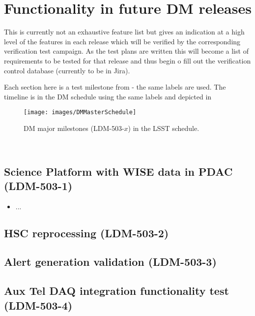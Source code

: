 \section{Functionality in future DM releases}

This is currently not an exhaustive feature list but gives an indication at a high level of the features in each release which will be verified by the corresponding verification test campaign.
As the test plans are written this will become a list of requirements to be tested for that release and thus begin o fill out the verification control database (currently to be in Jira).


Each section here is a test milestone from  - the same labels are used. The timeline is in the DM schedule using the same labels and depicted in 

\begin{figure}[htbp]
        \begin{center}
                 \texttt{[image: images/DMMasterSchedule]}
                 \caption{DM major milestones (LDM-503-$x$) in the LSST schedule. \label{fig:schedule}}
         \end{center}
 \end{figure}
~

\subsection{Science Platform with WISE data in PDAC \textbf{(LDM-503-1)}\label{LDM-503-1}}

\begin{itemize}
\item ...
\end{itemize}

\subsection{HSC reprocessing \textbf{(LDM-503-2)}\label{LDM-503-2}}

\subsection{Alert generation validation \textbf{(LDM-503-3)}\label{LDM-503-3}}

\subsection{Aux Tel DAQ integration functionality test \textbf{(LDM-503-4)}\label{LDM-503-4}}

